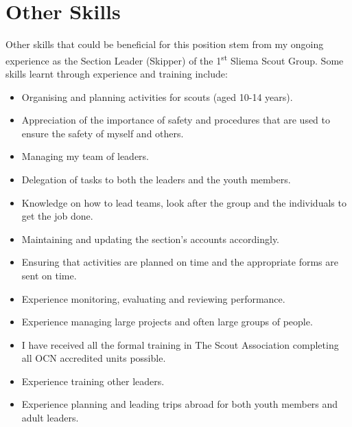 \documentclass[10pt]{article}
\begin{document}
	\section*{Other Skills}
	Other skills that could be beneficial for this position stem from my ongoing experience as the Section Leader (Skipper) of the 1\textsuperscript{st} Sliema Scout Group. Some skills learnt through experience and training include:
	\begin{itemize}
		\renewcommand\labelitemi{-$>$}
		\item Organising and planning activities for scouts (aged 10-14 years).
		\item Appreciation of the importance of safety and procedures that are used to ensure the safety of myself and others.
		\item Managing my team of leaders.
		\item Delegation of tasks to both the leaders and the youth members.
		\item Knowledge on how to lead teams, look after the group and the individuals to get the job done.
		\item Maintaining and updating the section's accounts accordingly. 
		\item Ensuring that activities are planned on time and the appropriate forms are sent on time.
		\item Experience monitoring, evaluating and reviewing performance.
		\item Experience managing large projects and often large groups of people.
		\item I have received all the formal training in The Scout Association completing all OCN accredited units possible.
		\item Experience training other leaders.
		\item Experience planning and leading trips abroad for both youth members and adult leaders.
	\end{itemize}
	
\end{document}
